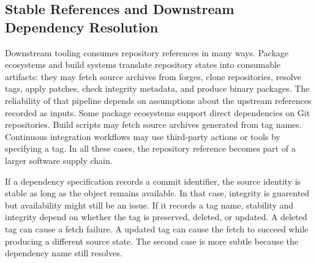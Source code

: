 


\subsection{Stable References and Downstream Dependency Resolution}
\label{subsec:bg-stable-references-dependency-resolution}

Downstream tooling consumes repository references in many ways.
Package ecosystems and build systems translate repository states into consumable artifacts: they may fetch source archives from forges, clone repositories, resolve tags, apply patches, check integrity metadata, and produce binary packages.
The reliability of that pipeline depends on assumptions about the upstream references recorded as inputs.
Some package ecosystems support direct dependencies on Git repositories.
Build scripts may fetch source archives generated from tag names.
Continuous integration workflows may use third-party actions or tools by specifying a tag.
In all these cases, the repository reference becomes part of a larger software supply chain.

If a dependency specification records a commit identifier, the source identity is stable as long as the object remains available.
In that case, integrity is guarented but availability might still be an issue.
If it records a tag name, stability and integrity depend on whether the tag is preserved, deleted, or updated.
A deleted tag can cause a fetch failure.
A updated tag can cause the fetch to succeed while producing a different source state.
The second case is more subtle because the dependency name still resolves.

